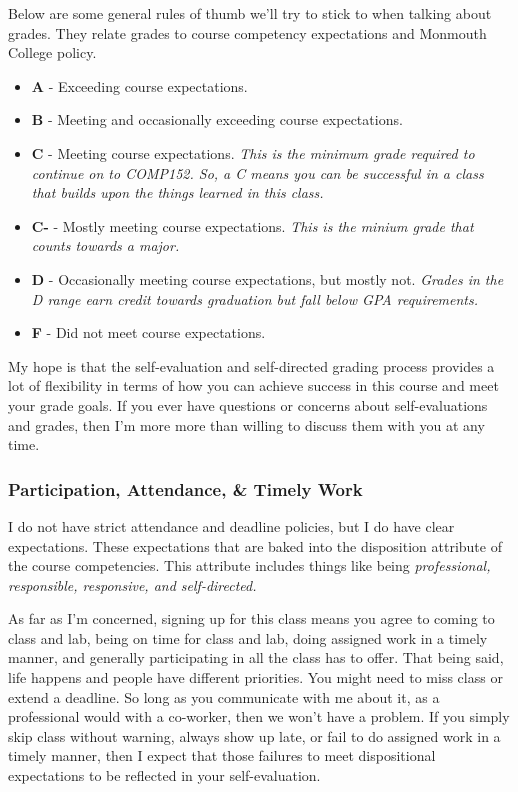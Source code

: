 \documentclass[10pt]{article}
\begin{document}
Below are some general rules of thumb we'll try to stick to when talking about grades. They relate grades to course competency expectations and Monmouth College policy.
\begin{itemize}
  \item \textbf{A} - Exceeding course expectations.
  \item \textbf{B} - Meeting and occasionally exceeding course expectations.
  \item \textbf{C} - Meeting course expectations. \textit{This is the minimum grade required to continue on to COMP152. So, a C means you can be successful in a class that builds upon the things learned in this class.}
  \item \textbf{C-} - Mostly meeting course expectations. \textit{This is the minium grade that counts towards a major.}
  \item \textbf{D} - Occasionally meeting course expectations, but mostly not. \textit{Grades in the D range earn credit towards graduation but fall below GPA requirements.}
  \item \textbf{F} - Did not meet course expectations.
\end{itemize}

My hope is that the self-evaluation and self-directed grading process provides a lot of flexibility in terms of how you can achieve success in this course and meet your grade goals. If you ever have questions or concerns about self-evaluations and grades, then I'm more more than willing to discuss them with you at any time.

\subsubsection{Participation, Attendance, \& Timely Work}

I do not have strict attendance and deadline policies, but I do have clear expectations. These expectations that are baked into the disposition attribute of the course competencies. This attribute includes things like being \textit{professional, responsible, responsive, and self-directed.}

As far as I'm concerned, signing up for this class means you agree to coming to class and lab, being on time for class and lab, doing assigned work in a timely manner, and generally participating in all the class has to offer.  That being said, life happens and people have different priorities.  You might need to miss class or extend a deadline.  So long as you communicate with me about it, as a professional would with a co-worker, then we won't have a problem. If you simply skip class without warning, always show up late, or fail to do assigned work in a timely manner, then I expect that those failures to meet dispositional expectations to be reflected in your self-evaluation.
\end{document}
